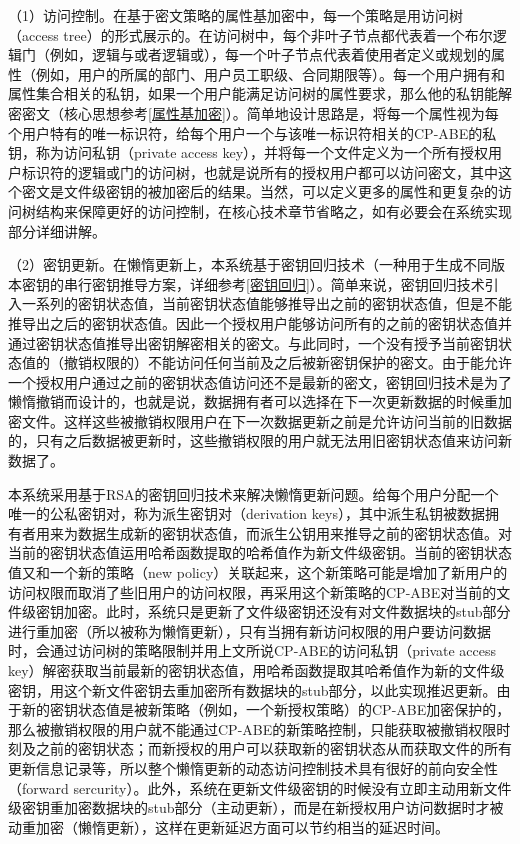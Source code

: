 \documentclass[promaster]{thesis-uestc}
\begin{document}
（1）访问控制。在基于密文策略的属性基加密中，每一个策略是用访问树（access tree）的形式展示的。在访问树中，每个非叶子节点都代表着一个布尔逻辑门（例如，逻辑与或者逻辑或），每一个叶子节点代表着使用者定义或规划的属性（例如，用户的所属的部门、用户员工职级、合同期限等）。每一个用户拥有和属性集合相关的私钥，如果一个用户能满足访问树的属性要求，那么他的私钥能解密密文（核心思想参考\ref{属性基加密}）。简单地设计思路是，将每一个属性视为每个用户特有的唯一标识符，给每个用户一个与该唯一标识符相关的CP-ABE的私钥，称为访问私钥（private access key），并将每一个文件定义为一个所有授权用户标识符的逻辑或门的访问树，也就是说所有的授权用户都可以访问密文，其中这个密文是文件级密钥的被加密后的结果。当然，可以定义更多的属性和更复杂的访问树结构来保障更好的访问控制，在核心技术章节省略之，如有必要会在系统实现部分详细讲解。

（2）密钥更新。在懒惰更新上，本系统基于密钥回归技术（一种用于生成不同版本密钥的串行密钥推导方案，详细参考\ref{密钥回归}）。简单来说，密钥回归技术引入一系列的密钥状态值，当前密钥状态值能够推导出之前的密钥状态值，但是不能推导出之后的密钥状态值。因此一个授权用户能够访问所有的之前的密钥状态值并通过密钥状态值推导出密钥解密相关的密文。与此同时，一个没有授予当前密钥状态值的（撤销权限的）不能访问任何当前及之后被新密钥保护的密文。由于能允许一个授权用户通过之前的密钥状态值访问还不是最新的密文，密钥回归技术是为了懒惰撤销而设计的，也就是说，数据拥有者可以选择在下一次更新数据的时候重加密文件。这样这些被撤销权限用户在下一次数据更新之前是允许访问当前的旧数据的，只有之后数据被更新时，这些撤销权限的用户就无法用旧密钥状态值来访问新数据了。

本系统采用基于RSA的密钥回归技术来解决懒惰更新问题。给每个用户分配一个唯一的公私密钥对，称为派生密钥对（derivation keys），其中派生私钥被数据拥有者用来为数据生成新的密钥状态值，而派生公钥用来推导之前的密钥状态值。对当前的密钥状态值运用哈希函数提取的哈希值作为新文件级密钥。当前的密钥状态值又和一个新的策略（new policy）关联起来，这个新策略可能是增加了新用户的访问权限而取消了些旧用户的访问权限，再采用这个新策略的CP-ABE对当前的文件级密钥加密。此时，系统只是更新了文件级密钥还没有对文件数据块的stub部分进行重加密（所以被称为懒惰更新），只有当拥有新访问权限的用户要访问数据时，会通过访问树的策略限制并用上文所说CP-ABE的访问私钥（private access key）解密获取当前最新的密钥状态值，用哈希函数提取其哈希值作为新的文件级密钥，用这个新文件密钥去重加密所有数据块的stub部分，以此实现推迟更新。由于新的密钥状态值是被新策略（例如，一个新授权策略）的CP-ABE加密保护的，那么被撤销权限的用户就不能通过CP-ABE的新策略控制，只能获取被撤销权限时刻及之前的密钥状态；而新授权的用户可以获取新的密钥状态从而获取文件的所有更新信息记录等，所以整个懒惰更新的动态访问控制技术具有很好的前向安全性（forward sercurity）。此外，系统在更新文件级密钥的时候没有立即主动用新文件级密钥重加密数据块的stub部分（主动更新），而是在新授权用户访问数据时才被动重加密（懒惰更新），这样在更新延迟方面可以节约相当的延迟时间。
\end{document}
